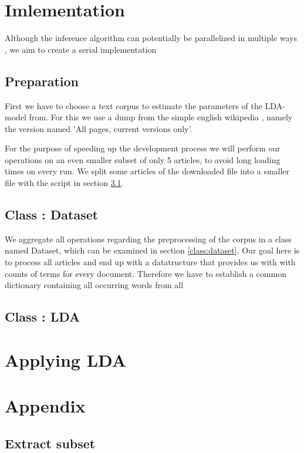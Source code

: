 \documentclass[12pt,landscape,twopage]{article}
\begin{document}
\section{Imlementation}
Although the inference algorithm can potentially be parallelized in multiple ways \cite{Newman2006ScalablePT,Wang2009PLDAPL}, we aim to create a serial implementation
\subsection{Preparation}
First we have to choose a text corpus to estimate the parameters of the LDA-model from. For this we use a dump from the simple english wikipedia \cite{simplewi84:online}, namely the version named 'All pages, current versions only'.

For the purpose of speeding up the development process we will perform our operations on an even smaller subset of only 5 articles, to avoid long loading times on every run. We split some articles of the downloaded file into a smaller file with the script in section \ref{extract}.

\subsection{Class : Dataset}
We aggregate all operations regarding the preprocessing of the corpus in a class named Dataset, which can be examined in section  \ref{class:dataset}. Our goal here is to process all articles and end up with a datatructure that provides us with with counts of terms for every document. Therefore we have to establish a common dictionary containing all occurring words from all

\subsection{Class : LDA}

\section{Applying LDA}
\newpage




\newpage
\section{Appendix}
\subsection{Extract subset} \label{extract}

\end{document}
